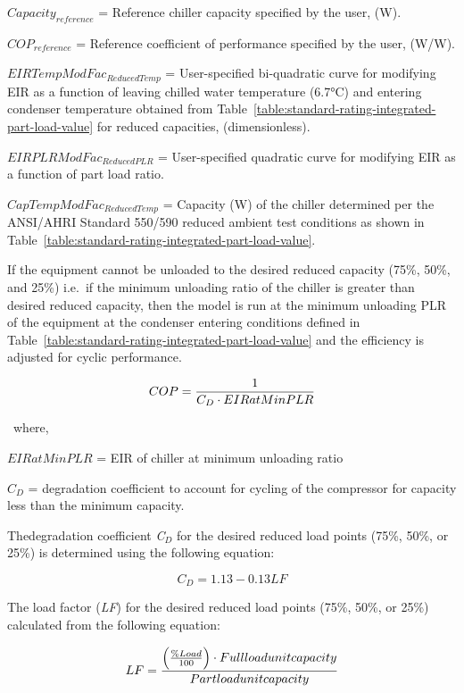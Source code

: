 \(Capacit{y_{reference}}\) = Reference chiller capacity specified by the user, (W).

\(CO{P_{reference}}\) = Reference coefficient of performance specified by the user, (W/W).

\(EIRTempModFa{c_{ReducedTemp}}\) = User-specified bi-quadratic curve for modifying EIR as a function of leaving chilled water temperature (6.7°C) and entering condenser temperature obtained from Table~\ref{table:standard-rating-integrated-part-load-value} for reduced capacities, (dimensionless).

\(EIRPLRModFa{c_{ReducedPLR}}\) = User-specified quadratic curve for modifying EIR as a function of part load ratio.

\(CapTempModFa{c_{ReducedTemp}}\) = Capacity (W) of the chiller determined per the ANSI/AHRI Standard 550/590 reduced ambient test conditions as shown in Table~\ref{table:standard-rating-integrated-part-load-value}.

If the equipment cannot be unloaded to the desired reduced capacity (75\%, 50\%, and 25\%) i.e.~if the minimum unloading ratio of the chiller is greater than desired reduced capacity, then the model is run at the minimum unloading PLR of the equipment at the condenser entering conditions defined in Table~\ref{table:standard-rating-integrated-part-load-value} and the efficiency is adjusted for cyclic performance.

\begin{equation}
COP = \frac{{\rm{1}}}{{{C_D} \cdot EIRatMinPLR}}
\end{equation}

~where,

\(EIRatMinPLR\) = EIR of chiller at minimum unloading ratio

\({C_D}\) = degradation coefficient to account for cycling of the compressor for capacity less than the minimum capacity.

Thedegradation coefficient \emph{C\(_{D}\)} for the desired reduced load points (75\%, 50\%, or 25\%) is determined using the following equation:

\begin{equation}
{C_D} = 1.13 - 0.13LF
\end{equation}

The load factor (\emph{LF}) for the desired reduced load points (75\%, 50\%, or 25\%) calculated from the following equation:

\begin{equation}
LF = \frac{{\left( {\frac{{\% Load}}{{100}}} \right) \cdot Full{\rm{ }}load{\rm{ }}unit{\rm{ }}capacity}}{{Part{\rm{ }}load{\rm{ }}unit{\rm{ }}capacity}}
\end{equation}

